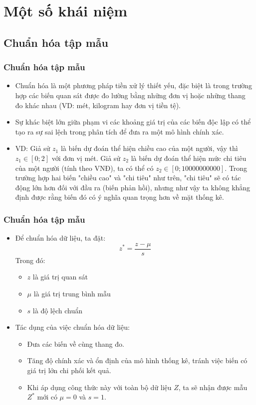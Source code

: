 \section{Một số khái niệm}
\subsection{Chuẩn hóa tập mẫu}
\begin{frame}
\frametitle{Chuẩn hóa tập mẫu}
	\begin{itemize}
    \item Chuẩn hóa là một phương pháp tiền xử lý thiết yếu, đặc biệt là trong trường hợp các biến quan sát được đo lường bằng những đơn vị hoặc những thang đo khác nhau (VD: mét, kilogram hay đơn vị tiền tệ). 
    \item Sự khác biệt lớn giữa phạm vi các khoảng giá trị của các biến độc lập có thể tạo ra sự sai lệch trong phân tích để đưa ra một mô hình chính xác. 
    \item VD: Giả sử $z_1$ là biến dự đoán thể hiện chiều cao của một người, vậy thì $z_1 \in [0;2]$ với đơn vị mét. Giả sử $z_2$ là biến dự đoán thể hiện mức chi tiêu của một người (tính theo VNĐ), ta có thể có $z_2 \in [0;10 000 000 000]$. Trong trường hợp hai biến "chiều cao" và "chi tiêu" như trên, "chi tiêu" sẽ có tác động lớn hơn đối với đầu ra (biến phản hồi), nhưng như vậy ta không khẳng định được rằng biến đó có ý nghĩa quan trọng hơn về mặt thống kê. 
\end{itemize}
\end{frame}
\begin{frame}
\frametitle{Chuẩn hóa tập mẫu}
	\begin{itemize}
	\item Để chuẩn hóa dữ liệu, ta đặt:
   \[
   z^* = \dfrac{z- \mu}{s}
   \]
   Trong đó:
   \begin{itemize}
       \item $z$ là giá trị quan sát
       \item $\mu$ là giá trị trung bình mẫu
       \item $s$ là độ lệch chuẩn
   \end{itemize}
   \item Tác dụng của việc chuẩn hóa dữ liệu:
   \begin{itemize}
       \item Đưa các biến về cùng thang đo.
       \item Tăng độ chính xác và ổn định của mô hình thống kê, tránh việc biến có giá trị lớn chi phối kết quả.
       \item Khi áp dụng công thức này với toàn bộ dữ liệu $Z$, ta sẽ nhận được mẫu $Z^*$ mới có $\mu = 0$ và $s=1$.
   \end{itemize}
	\end{itemize}
\end{frame}
